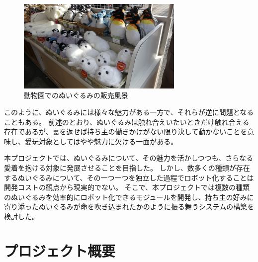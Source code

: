 \documentclass[uplatex,a4paper,12pt]{jsarticle}
\begin{document}
\begin{figure}[htbp]
  \centering
  \includegraphics[width=8cm]{images/backgrounds/zoo.jpg}
  \caption{動物園でのぬいぐるみの販売風景}
  \label{fig:zoo}
\end{figure}

このように、ぬいぐるみには様々な魅力がある一方で、それらが逆に問題となることもある。
前述のとおり、ぬいぐるみは触れ合えいたいときだけ触れ合える存在であるが、裏を返せば持ち主の働きかけがない限り決して動かないことを意味し、愛玩対象としてはやや魅力に欠ける一面がある。

本プロジェクトでは、ぬいぐるみについて、その魅力を活かしつつも、さらなる愛着を抱ける対象に発展させることを目指した。
しかし、数多くの種類が存在するぬいぐるみについて、その一つ一つを独立した過程でロボット化することは開発コストの観点から現実的でない。
そこで、本プロジェクトでは複数の種類のぬいぐるみを効率的にロボット化できるモジュールを開発し、持ち主の好みに寄り添ったぬいぐるみが命を吹き込まれたかのように振る舞うシステムの構築を検討した。



\section{プロジェクト概要}

\end{document}
